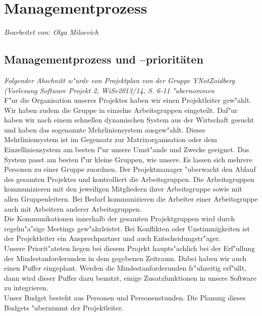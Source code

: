 \section{Managementprozess}

\textit{Bearbeitet von: Olga Miloevich}\\

\subsection{Managementprozess und --prioritäten}

\textit{Folgender Abschnitt w"urde von Projektplan von der Gruppe YNotZoidberg (Vorlesung Software Projekt 2, WiSe2013/14, S. 6-11 "ubernommen}\\

F"ur die Organisation unseres Projektes haben wir einen Projektleiter gew"ahlt.\\
Wir haben zudem die Gruppe in einzelne Arbeitsgruppen eingeteilt. Daf"ur haben wir nach einem schnellen dynamischen System aus der Wirtschaft gesucht und haben das sogenannte Mehrliniensystem ausgew"ahlt. Dieses Mehrliniensystem ist im Gegensatz zur Matrixorganisation oder dem Einzelliniensystem am besten f"ur unsere Umst"ande und Zwecke geeignet. Das System passt am besten f"ur kleine Gruppen, wie unsere. Es lassen sich mehrere Personen zu einer Gruppe zuordnen. \newline
Der Projektmanager "uberwacht den Ablauf des gesamten Projektes und kontrolliert die Arbeitsgruppen. Die Arbeitsgruppen kommunizieren mit den jeweiligen Mitgliedern ihrer Arbeitsgruppe sowie mit allen Gruppenleitern. Bei Bedarf kommunizieren die Arbeiter einer Arbeitsgruppe auch mit Arbeitern anderer Arbeitsgruppen. \\
Die Kommunikationen innerhalb der gesamten Projektgruppen wird durch regelm"a"sige Meetings gew"ahrleistet. Bei Konflikten oder Unstimmigkeiten ist der Projektleiter ein Ansprechpartner und auch Entscheidungstr"ager.\\
Unsere Priorit"ateten liegen bei diesem Projekt haupts"achlich bei der Erf"ullung der Mindestanforderunden in dem gegebenen Zeitraum. Dabei haben wir auch einen Puffer eingeplant. Werden die Mindestanforderunden fr"uhzeitig erf"ullt, dann wird dieser Puffer dazu benutzt, einige Zusatzfunktionen in unsere Software zu integrieren. \\
Unser Budget besteht aus Personen und Personenstunden. Die Planung dieses Budgets "ubernimmt der Projektleiter.\\

